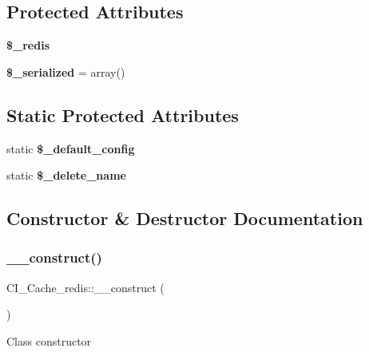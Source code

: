 \subsection*{Protected Attributes}
\begin{DoxyCompactItemize}
\item 
\mbox{\label{class_c_i___cache__redis_a96435d8704832aa42e7fcb1b0e5d2309}} 
{\bfseries \$\+\_\+redis}
\item 
\mbox{\label{class_c_i___cache__redis_a4de641d98da4a0e7839276fe3ce5338d}} 
{\bfseries \$\+\_\+serialized} = array()
\end{DoxyCompactItemize}
\subsection*{Static Protected Attributes}
\begin{DoxyCompactItemize}
\item 
static {\bfseries \$\+\_\+default\+\_\+config}
\item 
\mbox{\label{class_c_i___cache__redis_a9d819623427f019c3b0299fe5993e98e}} 
static {\bfseries \$\+\_\+delete\+\_\+name}
\end{DoxyCompactItemize}


\subsection{Constructor \& Destructor Documentation}
\mbox{\label{class_c_i___cache__redis_a9731da89feb6738ea4e80720a580ffae}} 
\subsubsection{\texorpdfstring{\+\_\+\+\_\+construct()}{\_\_construct()}}
{\footnotesize\ttfamily C\+I\+\_\+\+Cache\+\_\+redis\+::\+\_\+\+\_\+construct (\begin{DoxyParamCaption}{ }\end{DoxyParamCaption})}

Class constructor

